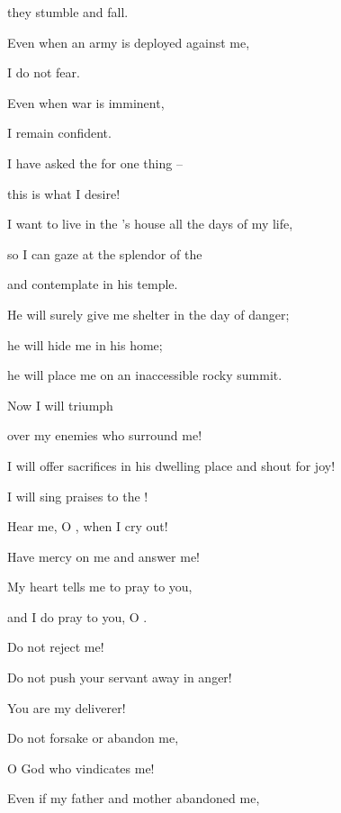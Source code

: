 {\par }{\Q they
stumble
and fall.
\par }{\Q {}Even
when an army
is deployed
against
me,
\par }{\Q I do not
fear.
\par }{\Q Even when
war
is imminent,
\par }{\Q I
remain confident.
\par }{\Q {}I have asked
the {}
for one thing –
\par }{\Q this is what I desire!
\par }{\Q I want to live in the
{}’s house all the days of my life,
\par }{\Q so I can gaze at the splendor of the
{}
\par }{\Q and contemplate in his temple.
\par }{\Q {}He will surely
give me shelter
in the day
of danger;
\par }{\Q he will hide
me in his home;
\par }{\Q he will place me on an inaccessible
rocky summit.
\par }{\Q {}Now
I will triumph
\par }{\Q over
my enemies
who surround
me!

\par }{\Q I will offer
sacrifices
in his dwelling
place and shout
for joy!

\par }{\Q I will sing
praises
to the
{}!
\par }{\Q {}Hear
me, O
{}, when
I cry
out!
\par }{\Q Have mercy
on me and answer me!
\par }{\Q {}My heart
tells
me to pray to you,

\par }{\Q and I do pray
to you, O
{}.
\par }{\Q {}Do not
reject
me!

\par }{\Q Do not
push
your servant
away
in anger!
\par }{\Q You are my deliverer!

\par }{\Q Do
not
forsake
or
abandon
me,
\par }{\Q O God
who vindicates me!
\par }{\Q {}Even if
my father
and mother
abandoned
me,

}
